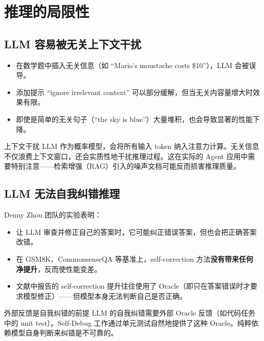 \section{推理的局限性}

\subsection{LLM 容易被无关上下文干扰}

\begin{itemize}
    \item 在数学题中插入无关信息（如 ``Mario's moustache costs \$10''），LLM 会被误导。
    \item 添加提示 ``ignore irrelevant context'' 可以部分缓解，但当无关内容量增大时效果有限。
    \item 即使是简单的无关句子（``the sky is blue''）大量堆积，也会导致显著的性能下降。
\end{itemize}

\begin{warningbox}{上下文干扰}
LLM 作为概率模型，会将所有输入 token 纳入注意力计算。无关信息不仅浪费上下文窗口，还会实质性地干扰推理过程。这在实际的 Agent 应用中需要特别注意——检索增强（RAG）引入的噪声文档可能反而损害推理质量。
\end{warningbox}

\subsection{LLM 无法自我纠错推理}

Denny Zhou 团队的实验表明：

\begin{itemize}
    \item 让 LLM 审查并修正自己的答案时，它可能纠正错误答案，但也会把正确答案改错。
    \item 在 GSM8K、CommonsenseQA 等基准上，self-correction 方法\textbf{没有带来任何净提升}，反而使性能变差。
    \item 文献中报告的 self-correction 提升往往使用了 Oracle（即只在答案错误时才要求模型修正）——但模型本身无法判断自己是否正确。
\end{itemize}

\begin{importantbox}{外部反馈是自我纠错的前提}
LLM 的自我纠错需要外部 Oracle 反馈（如代码任务中的 unit test）。Self-Debug 工作通过单元测试自然地提供了这种 Oracle。纯粹依赖模型自身判断来纠错是不可靠的。
\end{importantbox}

